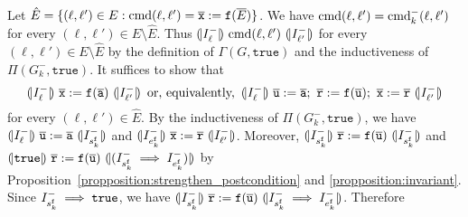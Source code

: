 Let $\hat{E} = \{ (\ell, \ell') \in E : \textmd{cmd} (\ell, \ell') =
\overline{\mathtt{x}} := \mathtt{f} (\overline{E}) \}$. We have
$\textmd{cmd} (\ell, \ell') = \textmd{cmd}^-_k (\ell, \ell')$ for every
$(\ell, \ell') \in E \setminus \hat{E}$. Thus $(\!| {I^-_{\ell}} |\!)\
\textmd{cmd} (\ell, \ell')\ (\!| {I^-_{\ell'}} |\!)$ for every $(\ell,
\ell') \in E \setminus \hat{E}$ by the definition of $\Gamma (G,
\mathtt{true})$ and the inductiveness of $\Pi (G^-_k,
\mathtt{true})$. It suffices to show that
\begin{equation*}
  \assert{I^-_{\ell}}\
  \overline{\mathtt{x}} := \mathtt{f} (\overline{\mathtt{a}})
  \ \assert{I^-_{\ell'}}
  \hspace{0.5em}
  \textmd{or, equivalently,}
  \hspace{0.5em}
  \assert{I^-_{\ell}}\ 
  \overline{\mathtt{u}} := \overline{\mathtt{a}};\ 
  \mathtt{\overline{r}} := \mathtt{f} (\overline{\mathtt{u}});\ 
  \overline{\mathtt{x}} := \mathtt{\overline{r}}
  \ \assert{I^-_{\ell'}}
\end{equation*}
for every $(\ell, \ell') \in \hat{E}$. 
By the inductiveness of $\Pi (G^-_k, \mathtt{true})$, we have
$\assert{I^-_{\ell}}\ \overline{\mathtt{u}} := \overline{\mathtt{a}}\
\assert{I^-_{s_k^\fun{f}}}$ and
$(\!| {I^-_{e_k^{\mathtt{{f}}}}} |\!)\ \overline{\mathtt{x}} :=
\mathtt{\overline{r}}\ (\!| {I^-_{\ell'}} |\!)$. 
Moreover,
$(\!| {I^-_{s_k^\mathtt{f}}} |\!)\
\mathtt{\overline{r}} := \mathtt{f}
(\overline{\mathtt{u}})\ (\!| {I^-_{s_k^{\mathtt{{f}}}}} |\!)$ and
$(\!| {\mathtt{true}} |\!)\ \mathtt{\overline{r}} := \mathtt{f}
(\overline{\mathtt{u}})\ (\!| {(I^-_{s_k^{\mathtt{{f}}}} \implies
  I^-_{e_k^{\mathtt{{f}}}})} |\!)$ by Proposition~\ref{propposition:strengthen_postcondition} and \ref{propposition:invariant}.
Since $I^-_{s_k^{\mathtt{{f}}}} \implies \mathtt{true}$, we have
$(\!| {I^-_{s_k^{\mathtt{{f}}}}} |\!)\
\mathtt{\overline{r}} := \mathtt{f}
(\overline{\mathtt{u}})\  (\!| {I^-_{s_k^{\mathtt{{f}}}}
  \implies I^-_{e_k^{\mathtt{{f}}}}} |\!)$. Therefore
\begin{prooftree}

    \noLine



\end{prooftree}